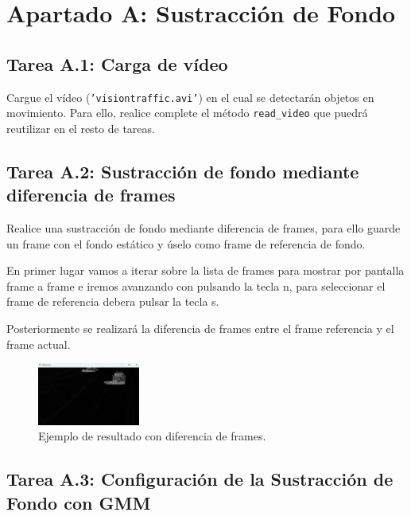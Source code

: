 \chapter{Apartado A: \textbf{Sustracción de Fondo}}
\label{chapter:tarea_a}


\section*{Tarea A.1: Carga de vídeo}
{}
Cargue el vídeo (\texttt{'visiontraffic.avi'}) en el cual se detectarán objetos en movimiento. Para ello, realice complete el método \texttt{read\_video} que puedrá reutilizar en el resto de tareas. 

\section*{Tarea A.2: Sustracción de fondo mediante diferencia de frames}
{}
Realice una sustracción de fondo mediante diferencia de frames, para ello guarde un frame con el fondo estático y úselo como frame de referencia de fondo.

En primer lugar vamos a iterar sobre la lista de frames para mostrar por pantalla frame a frame e iremos avanzando con pulsando la tecla n, para seleccionar el frame de referencia debera pulsar la tecla s.

Posteriormente se realizará la diferencia de frames entre el frame referencia y el frame actual.

\begin{figure}[H]
    \centering
    \includegraphics[width=0.3\textwidth]{Lab_4/template/figures/frame_difference.png}
    \caption{Ejemplo de resultado con diferencia de frames.}
    \label{fig:ejemplo_framediff}
\end{figure}

\section*{Tarea A.3: Configuración de la Sustracción de Fondo con GMM}
{}

